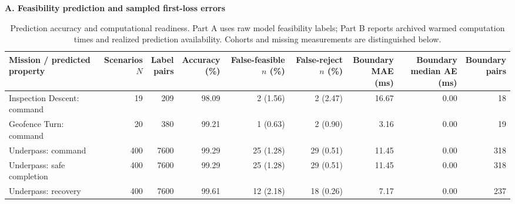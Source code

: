 \begin{table}[t]
\centering
\caption{Prediction accuracy and computational readiness. Part A uses
raw model feasibility labels; Part B reports archived warmed computation
times and realized prediction availability. Cohorts and missing
measurements are distinguished below.}
\label{tab:prediction_accuracy_readiness}
\begingroup
\scriptsize
\setlength{\tabcolsep}{3.5pt}
\renewcommand{\arraystretch}{1.15}
\textbf{A. Feasibility prediction and sampled first-loss errors}\par\smallskip
\begin{tabular}{@{}lrrrrrrrr@{}}
\toprule
Mission / predicted property &
\shortstack{Scenarios\\$N$} &
\shortstack{Label\\pairs} &
\shortstack{Accuracy\\(\%)} &
\shortstack{False-feasible\\$n$ (\%)} &
\shortstack{False-reject\\$n$ (\%)} &
\shortstack{Boundary\\MAE (ms)} &
\shortstack{Boundary\\median AE (ms)} &
\shortstack{Boundary\\pairs} \\
\midrule
Inspection Descent: command & 19 & 209 & 98.09 & 2 (1.56) & 2 (2.47) & 16.67 & 0.00 & 18 \\
Geofence Turn: command & 20 & 380 & 99.21 & 1 (0.63) & 2 (0.90) & 3.16 & 0.00 & 19 \\
\midrule
Underpass: command & 400 & 7600 & 99.29 & 25 (1.28) & 29 (0.51) & 11.45 & 0.00 & 318 \\
Underpass: safe completion & 400 & 7600 & 99.29 & 25 (1.28) & 29 (0.51) & 11.45 & 0.00 & 318 \\
Underpass: recovery & 400 & 7600 & 99.61 & 12 (2.18) & 18 (0.26) & 7.17 & 0.00 & 237 \\
\bottomrule
\end{tabular}


\end{table}

